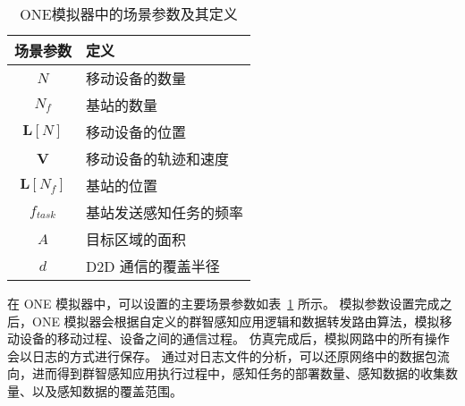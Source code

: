 \begin{table}[h]
  \vspace{-0.5em}
  \caption{ONE模拟器中的场景参数及其定义}
  \vspace{-0.5em}
  \centering
  \label{table_notations_ONE}
  \begin{tabular}{|c|p{7cm}|}
  \hline
  \textbf{场景参数} & \textbf{定义}\\
  \hline
  $N$ & 移动设备的数量\\\hline
  $N_f$ & 基站的数量\\\hline
  $\boldsymbol{L}[N]$ & 移动设备的位置\\\hline
  $\boldsymbol{V}$ & 移动设备的轨迹和速度\\\hline
  $\boldsymbol{L}[N_f]$ & 基站的位置\\\hline
  $f_{task}$ & 基站发送感知任务的频率\\\hline
  $A$ & 目标区域的面积\\\hline
  $d$ & D2D 通信的覆盖半径\\\hline
  \end{tabular}
  \vspace{-1em}
\end{table}

在 ONE 模拟器中，可以设置的主要场景参数如表~\ref{table_notations_ONE} 所示。
模拟参数设置完成之后，ONE 模拟器会根据自定义的群智感知应用逻辑和数据转发路由算法，模拟移动设备的移动过程、设备之间的通信过程。
仿真完成后，模拟网路中的所有操作会以日志的方式进行保存。
通过对日志文件的分析，可以还原网络中的数据包流向，进而得到群智感知应用执行过程中，感知任务的部署数量、感知数据的收集数量、以及感知数据的覆盖范围。



